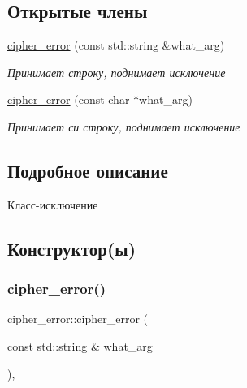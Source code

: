 \subsection*{Открытые члены}
\begin{DoxyCompactItemize}
\item 
\hyperlink{classcipher__error_aac662e216a84bfeb873303c7b88d029e}{cipher\+\_\+error} (const std\+::string \&what\+\_\+arg)
\begin{DoxyCompactList}\small\item\em Принимает строку, поднимает исключение \end{DoxyCompactList}\item 
\hyperlink{classcipher__error_a18cf27d9c2cd2538d3cb8f17e9a55f3e}{cipher\+\_\+error} (const char $\ast$what\+\_\+arg)
\begin{DoxyCompactList}\small\item\em Принимает си строку, поднимает исключение \end{DoxyCompactList}\end{DoxyCompactItemize}


\subsection{Подробное описание}
Класс-\/исключение 

\subsection{Конструктор(ы)}
\mbox{\label{classcipher__error_aac662e216a84bfeb873303c7b88d029e}} 
\subsubsection{\texorpdfstring{cipher\+\_\+error()}{cipher\_error()}\hspace{0.1cm}{\footnotesize\ttfamily [1/2]}}
{\footnotesize\ttfamily cipher\+\_\+error\+::cipher\+\_\+error (\begin{DoxyParamCaption}\item[{const std\+::string \&}]{what\+\_\+arg }\end{DoxyParamCaption})\hspace{0.3cm}{\ttfamily [inline]}, {\ttfamily [explicit]}}



